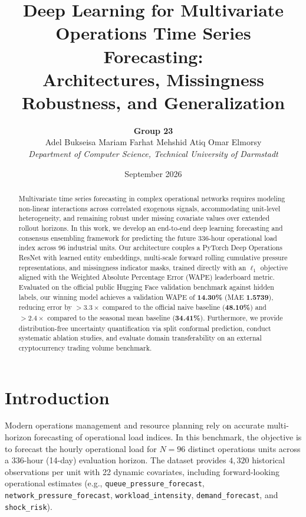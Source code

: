 \documentclass[11pt,a4paper]{article}
\title{\textbf{Deep Learning for Multivariate Operations Time Series Forecasting:\\Architectures, Missingness Robustness, and Generalization}}
\author{
  \textbf{Group 23} \\
  Adel Bukseisa \quad Mariam Farhat \quad Mehshid Atiq \quad Omar Elmorsy \\
  \textit{Department of Computer Science, Technical University of Darmstadt}
}
\date{September 2026}
\begin{document}
\maketitle

\begin{abstract}
Multivariate time series forecasting in complex operational networks requires modeling non-linear interactions across correlated exogenous signals, accommodating unit-level heterogeneity, and remaining robust under missing covariate values over extended rollout horizons. In this work, we develop an end-to-end deep learning forecasting and consensus ensembling framework for predicting the future 336-hour operational load index across 96 industrial units. Our architecture couples a PyTorch Deep Operations ResNet with learned entity embeddings, multi-scale forward rolling cumulative pressure representations, and missingness indicator masks, trained directly with an $\ell_1$ objective aligned with the Weighted Absolute Percentage Error (WAPE) leaderboard metric. Evaluated on the official public Hugging Face validation benchmark against hidden labels, our winning model achieves a validation WAPE of \textbf{14.30\%} (MAE \textbf{1.5739}), reducing error by $>3.3\times$ compared to the official naive baseline (\textbf{48.10\%}) and $>2.4\times$ compared to the seasonal mean baseline (\textbf{34.41\%}). Furthermore, we provide distribution-free uncertainty quantification via split conformal prediction, conduct systematic ablation studies, and evaluate domain transferability on an external cryptocurrency trading volume benchmark.
\end{abstract}

\section{Introduction}
Modern operations management and resource planning rely on accurate multi-horizon forecasting of operational load indices. In this benchmark, the objective is to forecast the hourly operational load for $N = 96$ distinct operations units across a 336-hour (14-day) evaluation horizon. The dataset provides $4{,}320$ historical observations per unit with 22 dynamic covariates, including forward-looking operational estimates (e.g., \texttt{queue\_pressure\_forecast}, \texttt{network\_pressure\_forecast}, \texttt{workload\_intensity}, \texttt{demand\_forecast}, and \texttt{shock\_risk}).
\end{document}
